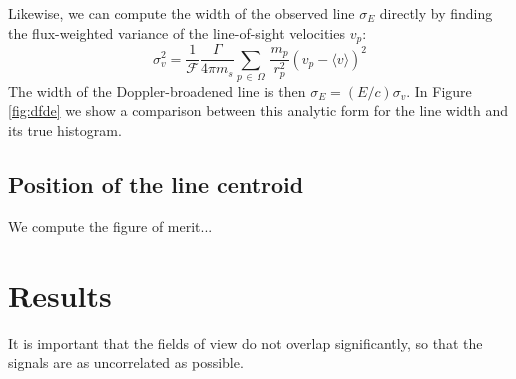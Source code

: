 \documentclass[aps,prl,10pt,twocolumn,superscriptaddress,showpacs]{revtex4-1}
\begin{document}
{Likewise, we can compute the width of the observed line $\sigma_E$ directly by finding the flux-weighted
variance of the line-of-sight velocities $v_p$:
\begin{equation} 
	\sigma_v^2 =\frac{1}{\mathcal{F}} \frac{\Gamma}{4\pi m_s} \sum_{p \, \in \, \Omega}
	\, \frac{m_p}{r_p^{2}} \left(v_p-\langle v\rangle\right)^2 
\label{eq:simsigma}
\end{equation}
The width of the Doppler-broadened line is then $\sigma_E = (E/c) \sigma_v$. In Figure \ref{fig:dfde} we show a comparison 
between this analytic form for the line width and its true histogram.


\subsection{Position of the line centroid}

We compute the figure of merit... 


\section{Results}
\label{sec:results}

It is important that the fields of view do not overlap significantly, so that the signals are as
uncorrelated as possible.

}
\end{document}
